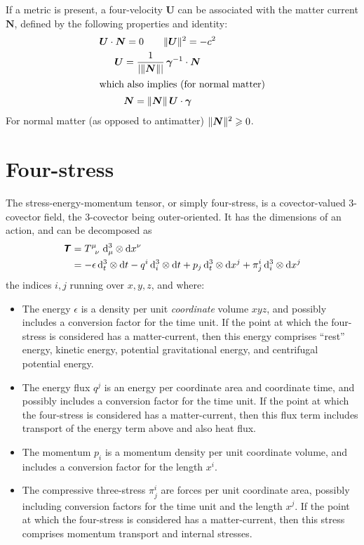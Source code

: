\documentclass[\ifafour a4paper,12pt,\else a5paper,10pt,\fi%
onecolumn,oneside,article,%
british%
]{memoir}
\theoremstyle{remark}
\theoremstyle{innote}
\newcommand*{\mathte}[1]{\textbf{\textit{\textsf{#1}}}}
\newcommand*{\di}{\mathrm{d}}%
\renewcommand*{\ge}{\geqslant}%
\DeclarePairedDelimiter\abs{\lvert}{\rvert}
\renewcommand*{\|}[1][]{\nonscript\:#1\vert\nonscript\:\mathopen{}}
\renewcommand*{\i}{\indices}
\newcommand*{\si}[1]{\di{#1}}
\newcommand*{\ttti}[1]{\di^{3}_{#1}}
\DeclarePairedDelimiter\nor{\lVert}{\rVert}
\newcommand*{\ve}{\bm{\gamma}}
\newcommand*{\vi}{\bm{\gamma}^{-1}}
\newcommand*{\yN}{\bm{N}}
\newcommand*{\yT}{\mathte{T}}
\newcommand*{\yU}{\bm{U}}
\begin{document}
\medskip

If a metric is present, a four-velocity $\yU$ can be associated with the matter current $\yN$, defined by the following properties and identity:
\begin{gather}
  \label{eq:prop_UN}
  \yU \cdot \yN = 0 \qquad \nor{\yU}^{2} = -c^{2}
  \\
  \label{eq:def_UN}
  \yU = \frac{1}{\abs{\nor{\yN}}}\, \vi\cdot\yN
  \\
  \shortintertext{which also implies (for normal matter)}
  \yN = \nor{\yN}\, \yU\cdot\ve
\end{gather}
For normal matter (as opposed to antimatter) $\nor{\yN}^{2} \ge 0$.



\section{Four-stress}
\label{sec:tensor_energy}

The stress-energy-momentum tensor, or simply four-stress, is a covector-valued 3-covector field, the 3-covector being outer-oriented. It has the dimensions of an action, and can be decomposed as
\begin{equation}
  \label{eq:def_T}
  \begin{split}
    \yT &= T\i{^{\mu}_{\nu}}\,\ttti{\mu}\otimes\si{x^{\nu}}
    \\&=
    -\epsilon\, \ttti{t}\otimes\si{t} 
    -q^{i}\, \ttti{i}\otimes\si{t} 
    +p_{j}\, \ttti{t}\otimes\si{x^{j}} 
    +\pi^{i}_{j}\, \ttti{i}\otimes\si{x^{j}}
  \end{split}
\end{equation}
the indices $i,j$ running over $x,y,z$, and where:
\begin{itemize}
\item The energy $\epsilon$ is a density per unit \emph{coordinate} volume $xyz$, and possibly includes a conversion factor for the time unit. If the point at which the four-stress is considered has a matter-current, then this energy comprises \enquote{rest} energy, kinetic energy, potential gravitational energy, and centrifugal potential energy.
\item The energy flux $q^{j}$ is an energy per coordinate area and coordinate time, and possibly includes a conversion factor for the time unit. If the point at which the four-stress is considered has a matter-current, then this flux term includes transport of the energy term above and also heat flux.
\item The momentum $p_{i}$ is a momentum density per unit coordinate volume, and includes a conversion factor for the length $x^{i}$.
\item The compressive three-stress $\pi^{i}_{j}$ are forces per unit coordinate area, possibly including conversion factors for the time unit and the length $x^{j}$.  If the point at which the four-stress is considered has a matter-current, then this stress comprises momentum transport and internal stresses.
\end{itemize}
\end{document}
